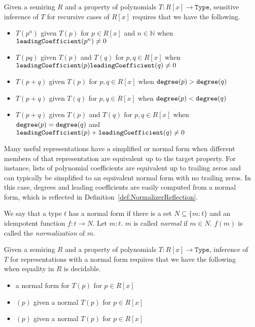 \begin{definition}
\label{def:SensitiveClosureReflection}
\leanok
Given a semiring $R$ and a property of polynomials $T:R[x] \to \mathtt{Type}$, sensitive inference of $T$ for recursive cases of $R[x]$ requires that we have the following.
\begin{itemize}
\item $T(p^n)$ given $T(p)$ for $p \in R[x]$ and $n \in \mathbb{N}$ when $\mathtt{leadingCoefficient}(p^n) \neq 0$
\item $T(pq)$ given $T(p)$ and $T(q)$ for $p,q \in R[x]$ when $\mathtt{leadingCoefficient}(p)\mathtt{leadingCoefficient}(q) \neq 0$
\item $T(p+q)$ given $T(p)$ for $p,q \in R[x]$ when $\mathtt{degree}(p) > \mathtt{degree}(q)$
\item $T(p+q)$ given $T(q)$ for $p,q \in R[x]$ when $\mathtt{degree}(p) < \mathtt{degree}(q)$
\item $T(p+q)$ given $T(p)$ and $T(q)$ for $p,q \in R[x]$ when $\mathtt{degree}(p) = \mathtt{degree}(q)$ and $\mathtt{leadingCoefficient}(p) + \mathtt{leadingCoefficient}(q) \neq 0$
\end{itemize}
\end{definition}

Many useful representations have a simplified or normal form when different members of that representation are equivalent up to the target property. For instance, lists of polynomial coefficients are equivalent up to trailing zeros and can typically be simplified to an equivalent normal form with no trailing zeros. In this case, degrees and leading coefficients are easily computed from a normal form, which is reflected in Definition~\ref{def:NormalizerReflection}.

\begin{definition}
\label{def:Normalizer}
\leanok
We say that a type $t$ has a normal form if there is a set $N \subseteq \{m:t\}$ and an idempotent function $f:t \to N$. Let $m : t$. $m$ is called \emph{normal} if $m \in N$. $f(m)$ is called the \emph{normalization} of $m$.
\end{definition}

\begin{definition}
\label{def:NormalizerReflection}
\leanok
{}
Given a semiring $R$ and a property of polynomials $T:R[x] \to \mathtt{Type}$, inference of $T$ for representations with a normal form requires that we have the following when equality in $R$ is decidable.
\begin{itemize}
\item a normal form for $T(p)$ for $p \in R[x]$
\item {}$(p)$ given a normal $T(p)$ for $p \in R[x]$
\item {}$(p)$ given a normal $T(p)$ for $p \in R[x]$
\end{itemize}
\end{definition}

